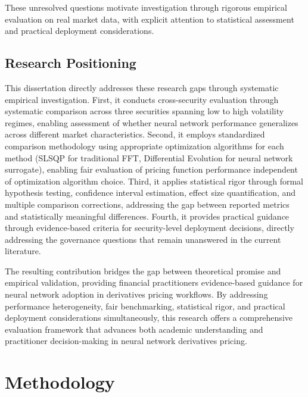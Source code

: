 \documentclass[12pt,a4paper]{article}
\begin{document}
These unresolved questions motivate investigation through rigorous empirical evaluation on real market data, with explicit attention to statistical assessment and practical deployment considerations.

\subsection{Research Positioning}

This dissertation directly addresses these research gaps through systematic empirical investigation. First, it conducts cross-security evaluation through systematic comparison across three securities spanning low to high volatility regimes, enabling assessment of whether neural network performance generalizes across different market characteristics. Second, it employs standardized comparison methodology using appropriate optimization algorithms for each method (SLSQP for traditional FFT, Differential Evolution for neural network surrogate), enabling fair evaluation of pricing function performance independent of optimization algorithm choice. Third, it applies statistical rigor through formal hypothesis testing, confidence interval estimation, effect size quantification, and multiple comparison corrections, addressing the gap between reported metrics and statistically meaningful differences. Fourth, it provides practical guidance through evidence-based criteria for security-level deployment decisions, directly addressing the governance questions that remain unanswered in the current literature.

The resulting contribution bridges the gap between theoretical promise and empirical validation, providing financial practitioners evidence-based guidance for neural network adoption in derivatives pricing workflows. By addressing performance heterogeneity, fair benchmarking, statistical rigor, and practical deployment considerations simultaneously, this research offers a comprehensive evaluation framework that advances both academic understanding and practitioner decision-making in neural network derivatives pricing.




\newpage

\section{Methodology}
\end{document}

